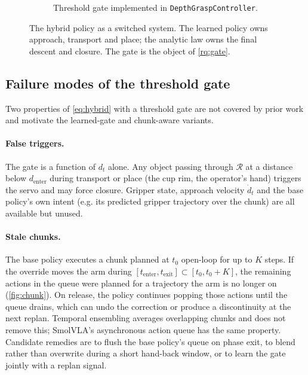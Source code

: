 \documentclass[11pt,a4paper]{article}
\theoremstyle{definition}
\begin{document}
\begin{figure}[t]
\begin{subfigure}[b]{0.40\textwidth}
{}
\caption{Threshold gate implemented in \texttt{DepthGraspController}.}
\label{fig:fsm}
\end{subfigure}
\caption{The hybrid policy as a switched system. The learned policy owns approach, transport and place; the analytic law owns the final descent and closure. The gate is the object of \cref{rq:gate}.}
\label{fig:hybrid}
\end{figure}

\subsection{Failure modes of the threshold gate}
\label{sec:chunk}

Two properties of \cref{eq:hybrid} with a threshold gate are not covered by prior work and motivate the learned-gate and chunk-aware variants.

\paragraph{False triggers.} The gate is a function of $d_t$ alone. Any object passing through $\mathcal{R}$ at a distance below $d_{\mathrm{enter}}$ during transport or place (the cup rim, the operator's hand) triggers the servo and may force closure. Gripper state, approach velocity $\dot d_t$ and the base policy's own intent (e.g. its predicted gripper trajectory over the chunk) are all available but unused.

\paragraph{Stale chunks.} The base policy executes a chunk planned at $t_0$ open-loop for up to $K$ steps. If the override moves the arm during $[t_{\mathrm{enter}},t_{\mathrm{exit}}]\subset[t_0,t_0+K]$, the remaining actions in the queue were planned for a trajectory the arm is no longer on (\cref{fig:chunk}). On release, the policy continues popping those actions until the queue drains, which can undo the correction or produce a discontinuity at the next replan. Temporal ensembling averages overlapping chunks and does not remove this; SmolVLA's asynchronous action queue has the same property. Candidate remedies are to flush the base policy's queue on phase exit, to blend rather than overwrite during a short hand-back window, or to learn the gate jointly with a replan signal.
\end{document}
